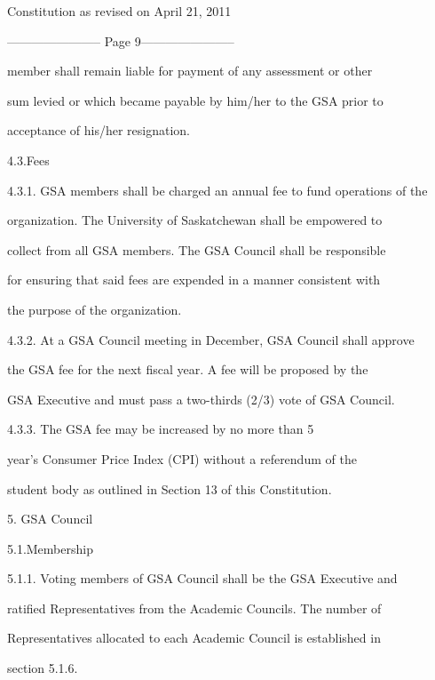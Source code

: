 \documentclass{article}
\begin{document}
  Constitution as revised on April 21, 2011  


----------------------- Page 9-----------------------

member  shall  remain  liable  for  payment  of  any  assessment  or  other  

sum levied or which became payable by him/her to the GSA prior to  

acceptance of his/her resignation.  



4.3.Fees  



4.3.1. GSA members shall be charged an annual fee to fund operations of the  

organization. The University of Saskatchewan shall be empowered to  

collect from all GSA members. The GSA Council shall be responsible  

for ensuring that said fees  are  expended in  a  manner  consistent with  

the purpose of the organization.  



4.3.2. At a GSA Council meeting in December, GSA Council shall approve  

the  GSA  fee  for  the  next  fiscal  year.  A  fee  will  be  proposed  by  the  

GSA Executive and must pass a two-thirds (2/3) vote of GSA Council.  



4.3.3. The GSA fee may be increased by no more than 5%

year’s  Consumer  Price  Index  (CPI)  without  a  referendum  of  the  

student body as outlined in Section 13 of this Constitution.  



  



5.  GSA Council  



5.1.Membership  



5.1.1. Voting  members  of    GSA  Council  shall  be  the  GSA  Executive  and  

ratified Representatives from the Academic Councils. The number of  

Representatives allocated to each Academic Council is established in  

section 5.1.6.  
\end{document}
